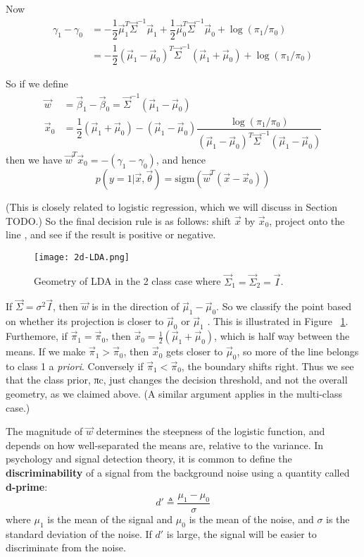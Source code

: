Now
\begin{align}
\gamma_1-\gamma_0& = -\dfrac{1}{2}\vec{\mu}_1^T\vec{\Sigma}^{-1}\vec{\mu}_1+\dfrac{1}{2}\vec{\mu}_0^T\vec{\Sigma}^{-1}\vec{\mu}_0 + \log(\pi_1/\pi_0) \\
 & =-\dfrac{1}{2}(\vec{\mu}_1-\vec{\mu}_0)^T\vec{\Sigma}^{-1}(\vec{\mu}_1+\vec{\mu}_0)+ \log(\pi_1/\pi_0)
\end{align}

So if we define
\begin{align}
\vec{w}& =\vec{\beta}_1-\vec{\beta}_0=\vec{\Sigma}^{-1}(\vec{\mu}_1-\vec{\mu}_0) \\
\vec{x}_0& =\dfrac{1}{2}(\vec{\mu}_1+\vec{\mu}_0)-(\vec{\mu}_1-\vec{\mu}_0)\dfrac{\log(\pi_1/\pi_0)}{(\vec{\mu}_1-\vec{\mu}_0)^T\vec{\Sigma}^{-1}(\vec{\mu}_1-\vec{\mu}_0)}
\end{align}
then we have $\vec{w}^T\vec{x}_0=-(\gamma_1-\gamma_0)$, and hence
\begin{equation}
p(y=1|\vec{x},\vec{\theta})=\text{sigm}(\vec{w}^T(\vec{x}-\vec{x}_0))
\end{equation}

(This is closely related to logistic regression, which we will discuss in Section TODO.) So the final decision rule is as follows: shift $\vec{x}$ by $\vec{x}_0$, project onto the line , and see if the result is positive or negative.

\begin{figure}[hbtp]
\centering
    \texttt{[image: 2d-LDA.png]}
\caption{Geometry of LDA in the 2 class case where $\vec{\Sigma}_1=\vec{\Sigma}_2=\vec{I}$.}
\label{fig:2d-LDA} 
\end{figure}

If $\vec{\Sigma}=\sigma^2\vec{I}$, then $\vec{w}$ is in the direction of $\vec{\mu}_1-\vec{\mu}_0$. So we classify the point based on whether its projection is closer to $\vec{\mu}_0$ or $\vec{\mu}_1$ . This is illustrated in Figure ~\ref{fig:2d-LDA}. Furthemore, if $\vec{\pi}_1=\vec{\pi}_0$, then $\vec{x}_0=\frac{1}{2}(\vec{\mu}_1+\vec{\mu}_0)$, which is half way between the means. If we make $\vec{\pi}_1>\vec{\pi}_0$, then $\vec{x}_0$ gets closer to $\vec{\mu}_0$, so more of the line belongs to class 1 a \emph{priori}. Conversely if $\vec{\pi}_1<\vec{\pi}_0$, the boundary shifts right. Thus we see that the class prior, πc, just changes the decision threshold, and not the overall geometry, as we claimed above. (A similar argument applies in the multi-class case.)

The magnitude of $\vec{w}$ determines the steepness of the logistic function, and depends on how well-separated the means are, relative to the variance. In psychology and signal detection theory, it is common to define the \textbf{discriminability} of a signal from the background noise using a quantity called \textbf{d-prime}:
\begin{equation}
d' \triangleq \dfrac{\mu_1-\mu_0}{\sigma}
\end{equation}
where $\mu_1$ is the mean of the signal and $\mu_0$ is the mean of the noise, and $\sigma$ is the standard deviation of the noise. If $d'$ is large, the signal will be easier to discriminate from the noise.


